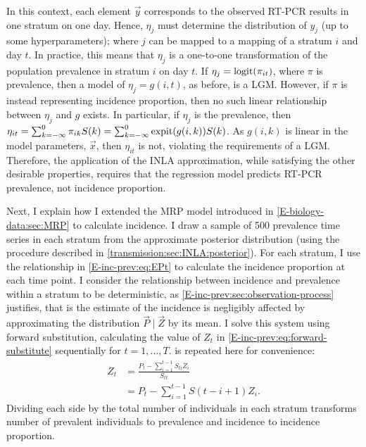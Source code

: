 \documentclass[thesis.tex]{subfiles}
\begin{document}
In this context, each element $\vec{y}$ corresponds to the observed RT-PCR results in one stratum on one day.
Hence, $\eta_{j}$ must determine the distribution of $y_{j}$ (up to some hyperparameters); where $j$ can be mapped to a mapping of a stratum $i$ and day $t$.
In practice, this means that $\eta_j$ is a one-to-one transformation of the population prevalence in stratum $i$ on day $t$.
If $\eta_j = \operatorname{logit}(\pi_{it})$, where $\pi$ is prevalence, then a model of $\eta_j = g(i, t)$, as before, is a LGM.
However, if $\pi$ is instead representing incidence proportion, then no such linear relationship between $\eta_j$ and $g$ exists.
In particular, if $\eta_j$ is the prevalence, then $\eta_{it} = \sum_{k=-\infty}^0 \pi_{ik} S(k) = \sum_{k=-\infty}^0 \operatorname{expit}(g(i, k)) S(k)$.
As $g(i, k)$ is linear in the model parameters, $\vec{x}$, then $\eta_{it}$ is not, violating the requirements of a LGM.
Therefore, the application of the INLA approximation, while satisfying the other desirable properties, requires that the regression model predicts RT-PCR prevalence, not incidence proportion.

Next, I explain how I extended the MRP model introduced in \cref{E-biology-data:sec:MRP} to calculate incidence.
I draw a sample of 500 prevalence time series in each stratum from the approximate posterior distribution (using the procedure described in \cref{transmission:sec:INLA:posterior}).
For each stratum, I use the relationship in \cref{E-inc-prev:eq:EPt} to calculate the incidence proportion at each time point.
I consider the relationship between incidence and prevalence within a stratum to be deterministic, as \cref{E-inc-prev:sec:observation-process} justifies, that is the estimate of the incidence is negligibly affected by approximating the distribution $\vec{P} \mid \vec{Z}$ by its mean.
I solve this system using forward substitution, calculating the value of $Z_t$ in \cref{E-inc-prev:eq:forward-substitute} sequentially for $t = 1, \dots, T$.
 is repeated here for convenience:
\begin{align}
Z_t
&= \frac{P_t - \sum_{i=1}^{t-1} S_{ti} Z_i}{S_{tt}} \\
&= P_t - \sum_{i=1}^{t-1} S(t - i + 1) Z_i.
\label{transmission:eq:forward-substitute}
\end{align}
Dividing each side by the total number of individuals in each stratum transforms number of prevalent individuals to prevalence and incidence to incidence proportion.
\end{document}
